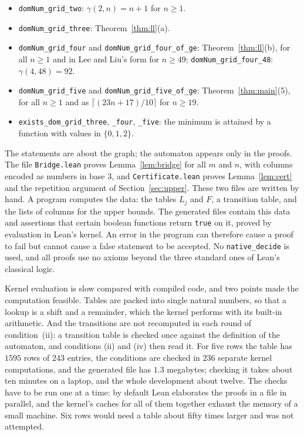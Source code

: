 \documentclass[12pt]{article}
\newcommand{\ce}[1]{\lceil #1 \rceil}
\theoremstyle{plain}
\theoremstyle{remark}
\begin{document}
\begin{itemize}
\item \texttt{domNum\_grid\_two}: $\gamma(2,n)=n+1$ for $n\ge1$.
\item \texttt{domNum\_grid\_three}: Theorem~\ref{thm:ll}(a).
\item \texttt{domNum\_grid\_four} and \texttt{domNum\_grid\_four\_of\_ge}:
Theorem~\ref{thm:ll}(b), for all $n\ge1$ and in Lee and Liu's form for $n\ge49$;
\texttt{domNum\_grid\_four\_48}: $\gamma(4,48)=92$.
\item \texttt{domNum\_grid\_five} and \texttt{domNum\_grid\_five\_of\_ge}:
Theorem~\ref{thm:main}(5), for all $n\ge1$ and as $\ce{(23n+17)/10}$ for $n\ge19$.
\item \texttt{exists\_dom\_grid\_three}, \texttt{\_four}, \texttt{\_five}: the minimum is
attained by a function with values in $\{0,1,2\}$.
\end{itemize}

The statements are about the graph; the automaton appears only in the proofs. The file
\texttt{Bridge.lean} proves Lemma~\ref{lem:bridge} for all $m$ and $n$, with columns encoded as
numbers in base $3$, and \texttt{Certificate.lean} proves Lemma~\ref{lem:cert} and the
repetition argument of Section~\ref{sec:upper}. These two files are written by hand. A program computes
the data: the tables $L_j$ and $F$, a transition table, and the lists of columns for the upper
bounds. The generated files contain this data and assertions that certain boolean functions
return \texttt{true} on it, proved by evaluation in Lean's kernel. An error in the program can
therefore cause a proof to fail but cannot cause a false statement to be accepted. No
\texttt{native\_decide} is used, and all proofs use no axioms beyond the three standard ones of
Lean's classical logic.

Kernel evaluation is slow compared with compiled code, and two points made the computation
feasible. Tables are packed into single natural numbers, so that a lookup is a shift and a
remainder, which the kernel performs with its built-in arithmetic. And the transitions are not
recomputed in each round of condition~(ii): a transition table is checked once against the
definition of the automaton, and conditions (ii) and (iv) then read it. For five rows the
table has $1595$ rows of $243$ entries, the conditions are checked in $236$ separate kernel
computations, and the generated file has $1.3$ megabytes; checking it takes about ten minutes
on a laptop, and the whole development about twelve. The checks have to be run one at a time:
by default Lean elaborates the proofs in a file in parallel, and the kernel's caches for all of
them together exhaust the memory of a small machine.
Six rows would need a table about fifty times larger and was not attempted.
\end{document}
